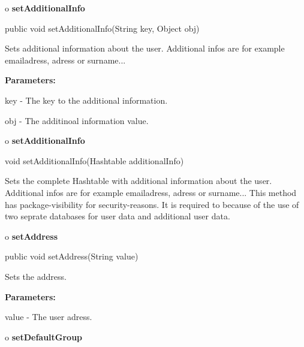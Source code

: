 o {\bf setAdditionalInfo} 

\begin{PRE}
 public void setAdditionalInfo(String key,
                               Object obj)
\end{PRE}

\begin{description}
\htmlDD Sets additional information about the user. Additional infos are for
example emailadress, adress or surname... 

\begin{description}
\item {\bf Parameters:}  

key - The key to the additional information.  

obj - The additinoal information value.  
\end{description}

\end{description}

o {\bf setAdditionalInfo} 

\begin{PRE}
 void setAdditionalInfo(Hashtable additionalInfo)
\end{PRE}

\begin{description}
\htmlDD Sets the complete Hashtable with additional information about the
user. Additional infos are for example emailadress, adress or surname... This
method has package-visibility for security-reasons. It is required to because
of the use of two seprate databases for user data and additional user data. 

\end{description}

o {\bf setAddress} 

\begin{PRE}
 public void setAddress(String value)
\end{PRE}

\begin{description}
\htmlDD Sets the address. 

\begin{description}
\item {\bf Parameters:}  

value - The user adress.  
\end{description}

\end{description}

o {\bf setDefaultGroup} 

